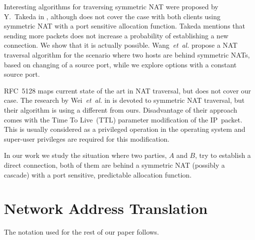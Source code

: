 \documentclass{acm_proc_article-sp}
\begin{document}
Interesting algorithms for traversing symmetric NAT were proposed by Y.~Takeda in \citep{takeda}, although does not cover the case with both clients using symmetric NAT
with a port sensitive allocation function. Takeda mentions that sending more packets does not increase a probability of establishing a new connection.
We show that it is actually possible. Wang~\emph{et~al.} \citep{Wang:2006:RSN:1156422.1156550} propose a NAT traversal algorithm for the scenario where two hosts are
behind symmetric NATs, based on changing of a source port, while we explore options with a constant source port.

RFC~5128 \citep{rfc5128} maps current state of the art in NAT traversal, but does not cover our case. 
The research by Wei~\emph{et~al.} in \citep{wei} is devoted to symmetric NAT traversal, but their algorithm is using a different from ours.
Disadvantage of their approach comes with the Time To Live~(TTL) parameter modification of the IP~packet. This is usually considered
as a privileged operation in the operating system and super-user privileges are required for this modification. 

In our work we study the situation where two parties, $A$ and $B$, try to establish a direct connection, both of them are behind 
a symmetric NAT (possibly a cascade) with a port sensitive, predictable allocation function. 

\section{Network Address Translation}
The notation used for the rest of our paper follows.

\end{document}
